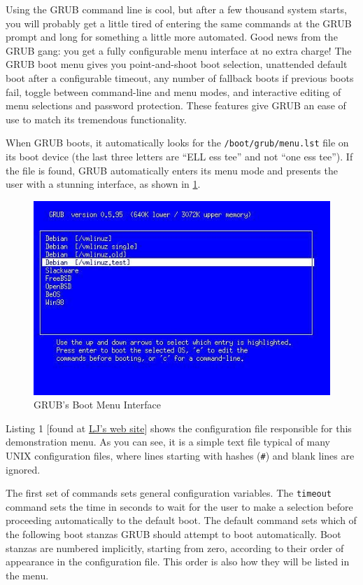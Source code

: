 \documentclass{article}
\begin{document}
Using the GRUB command line is cool, but after a few thousand system starts, you will probably get a little tired of entering the same commands at the GRUB prompt and long for something a little more automated. Good news from the GRUB gang: you get a fully configurable menu interface at no extra charge! The GRUB boot menu gives you point-and-shoot boot selection, unattended default boot after a configurable timeout, any number of fallback boots if previous boots fail, toggle between command-line and menu modes, and interactive editing of menu selections and password protection. These features give GRUB an ease of use to match its tremendous functionality.

When GRUB boots, it automatically looks for the \texttt{/boot/grub/menu.lst} file on its boot device (the last three letters are “ELL ess tee” and not “one ess tee”). If the file is found, GRUB automatically enters its menu mode and presents the user with a stunning interface, as shown in \ref{fig:menu}.

      \begin{figure}
      \centering
      \includegraphics[width=0.8\linewidth]{Boot-with-GRUB_w768_GRUB-menu.jpg}
      \caption{GRUB's Boot Menu Interface}
      \label{fig:menu}
      \end{figure}

Listing 1
[found at \href{ftp://ftp.linuxjournal.com/pub/lj/listings/issue85/}{LJ's web site}]
shows the configuration file responsible for this demonstration menu. As you can see, it is a simple text file typical of many UNIX configuration files, where lines starting with hashes (\texttt{\#}) and blank lines are ignored.


The first set of commands sets general configuration variables. The \texttt{timeout} command sets the time in seconds to wait for the user to make a selection before proceeding automatically to the default boot. The default command sets which of the following boot stanzas GRUB should attempt to boot automatically. Boot stanzas are numbered implicitly, starting from zero, according to their order of appearance in the configuration file. This order is also how they will be listed in the menu.
\end{document}
